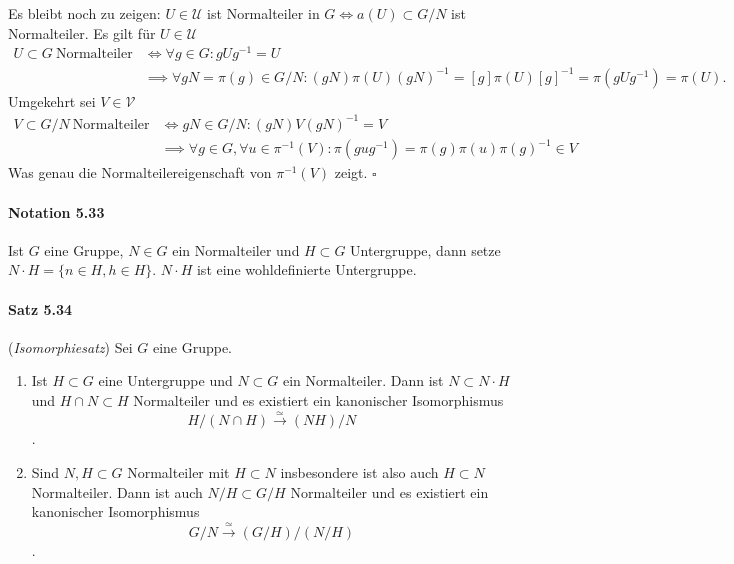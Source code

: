 \documentclass{scrartcl}
\begin{document}
Es bleibt noch zu zeigen: $U \in \mathcal{U}$ ist Normalteiler in $G \Leftrightarrow a(U)
\subset G/N$ ist Normalteiler. Es gilt für $U \in \mathcal{U}$
\begin{align*}
  U \subset G~\text{Normalteiler} &\iff \forall g \in G: gUg^{-1} = U \\
                                  &\implies \forall gN = \pi(g) \in G/N: (gN)\pi(U)(gN)^{-1}
                                    = [g]\pi(U)[g]^{-1} =\pi(gUg^{-1}) = \pi(U).
\end{align*}
Umgekehrt sei $V \in \mathcal{V}$
\begin{align*}
  V \subset G/N~\text{Normalteiler} &\iff gN \in G/N: (gN)V(gN)^{-1} = V \\
                                    &\implies \forall g \in G, \forall u \in \pi^{-1}(V):
                                      \pi(gug^{-1}) = \pi(g)\pi(u)\pi(g)^{-1} \in V
\end{align*}
Was genau die Normalteilereigenschaft von $\pi^{-1}(V)$ zeigt.
\hfill $\square$

\paragraph{Notation 5.33} Ist $G$ eine Gruppe, $N \in G$ ein Normalteiler und $H
\subset G$ Untergruppe, dann setze $N \cdot H = \{n \in H, h \in H\}$. $N \cdot
H$ ist eine wohldefinierte Untergruppe.

\paragraph{Satz 5.34} (\textit{Isomorphiesatz}) Sei $G$ eine Gruppe.
\begin{enumerate}
\item Ist $H \subset G$ eine Untergruppe und $N \subset G$ ein Normalteiler.
  Dann ist $N \subset N \cdot H$ und $H \cap N \subset H$ Normalteiler und es
  existiert ein kanonischer Isomorphismus
  \[
    H/(N \cap H) \overset{\simeq}{\to} (NH)/N
  \]
  .
\item Sind $N, H \subset G$ Normalteiler mit $H \subset N$ insbesondere ist also
  auch $H \subset N$ Normalteiler. Dann ist auch $N/H \subset G/H$ Normalteiler
  und es existiert ein kanonischer Isomorphismus
  \[
    G/N \overset{\simeq}{\to}(G/H)/(N/H)
  \]
  .
\end{enumerate}
\end{document}

